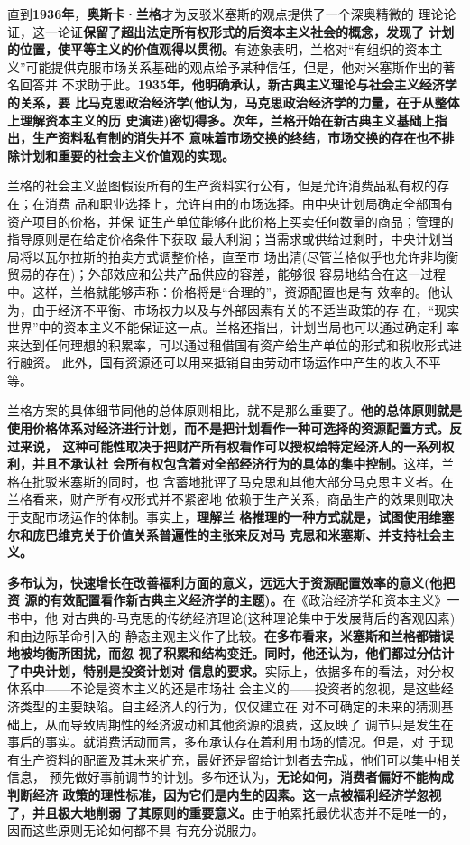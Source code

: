 直到\textbf{1936年}，\textbf{奥斯卡·兰格}才为反驳米塞斯的观点提供了一个深奥精微的
理论论证，这一论证\textbf{保留了超出法定所有权形式的后资本主义社会的概念，发现了
  计划的位置，使平等主义的价值观得以贯彻。}有迹象表明，兰格对“有组织的资本主
义”可能提供克服市场关系基础的观点给予某种信任，但是，他对米塞斯作出的著名回答并
不求助于此。\textbf{1935年，他明确承认，新古典主义理论与社会主义经济学的关系，要
  比马克思政治经济学(他认为，马克思政治经济学的力量，在于从整体上理解资本主义的历
  史演进)密切得多。次年，兰格开始在新古典主义基础上指出，生产资料私有制的消失并不
  意味着市场交换的终结，市场交换的存在也不排除计划和重要的社会主义价值观的实现。}

兰格的社会主义蓝图假设所有的生产资料实行公有，但是允许消费品私有权的存在；在消费
品和职业选择上，允许自由的市场选择。由中央计划局确定全部国有资产项目的价格，并保
证生产单位能够在此价格上买卖任何数量的商品；管理的指导原则是在给定价格条件下获取
最大利润；当需求或供给过剩时，中央计划当局将以瓦尔拉斯的拍卖方式调整价格，直至市
场出清(尽管兰格似乎也允许非均衡贸易的存在)；外部效应和公共产品供应的容差，能够很
容易地结合在这一过程中。这样，兰格就能够声称：价格将是“合理的”，资源配置也是有
效率的。他认为，由于经济不平衡、市场权力以及与外部因素有关的不适当政策的存
在，“现实世界”中的资本主义不能保证这一点。兰格还指出，计划当局也可以通过确定利
率来达到任何理想的积累率，可以通过租借国有资产给生产单位的形式和税收形式进行融资。
此外，国有资源还可以用来抵销自由劳动市场运作中产生的收入不平等。

兰格方案的具体细节同他的总体原则相比，就不是那么重要了。\textbf{他的总体原则就是
  使用价格体系对经济进行计划，而不是把计划看作一种可选择的资源配置方式。反过来说，
  这种可能性取决于把财产所有权看作可以授权给特定经济人的一系列权利，并且不承认社
  会所有权包含着对全部经济行为的具体的集中控制。}这样，兰格在批驳米塞斯的同时，也
含蓄地批评了马克思和其他大部分马克思主义者。在兰格看来，财产所有权形式并不紧密地
依赖于生产关系，商品生产的效果则取决于支配市场运作的体制。事实上，\textbf{理解兰
  格推理的一种方式就是，试图使用维塞尔和庞巴维克关于价值关系普遍性的主张来反对马
  克思和米塞斯、并支持社会主义。}

\textbf{多布认为，快速增长在改善福利方面的意义，远远大于资源配置效率的意义(他把资
  源的有效配置看作新古典主义经济学的主题)。}在《政治经济学和资本主义》一书中，他
对古典的-马克思的传统经济理论(这种理论集中于发展背后的客观因素)和由边际革命引入的
静态主观主义作了比较。\textbf{在多布看来，米塞斯和兰格都错误地被均衡所困扰，而忽
  视了积累和结构变迁。同时，他还认为，他们都过分估计了中央计划，特别是投资计划对
  信息的要求。}实际上，依据多布的看法，对分权体系中——不论是资本主义的还是市场社
会主义的——投资者的忽视，是这些经济类型的主要缺陷。自主经济人的行为，仅仅建立在
对不可确定的未来的猜测基础上，从而导致周期性的经济波动和其他资源的浪费，这反映了
调节只是发生在事后的事实。就消费活动而言，多布承认存在着利用市场的情况。但是，对
于现有生产资料的配置及其未来扩充，最好还是留给计划者去完成，他们可以集中相关信息，
预先做好事前调节的计划。多布还认为，\textbf{无论如何，消费者偏好不能构成判断经济
  政策的理性标准，因为它们是内生的因素。这一点被福利经济学忽视了，并且极大地削弱
  了其原则的重要意义。}由于帕累托最优状态并不是唯一的，因而这些原则无论如何都不具
有充分说服力。

